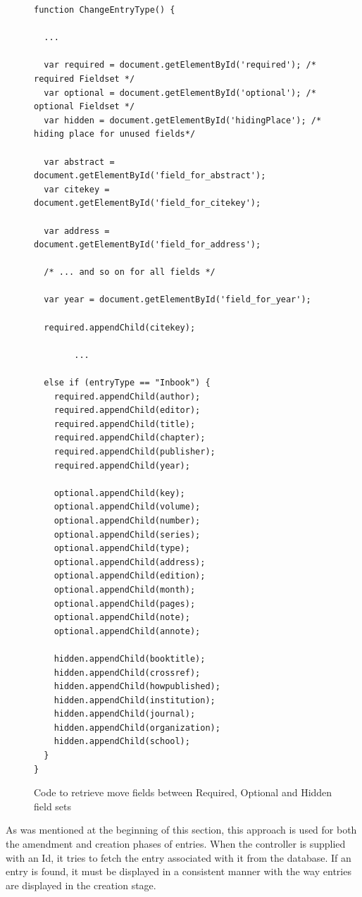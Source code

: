\begin{figure}
	\begin{center}
			\lstset{language=JavaScript} 
			\begin{lstlisting}
function ChangeEntryType() {

  ...

  var required = document.getElementById('required'); /* required Fieldset */
  var optional = document.getElementById('optional'); /* optional Fieldset */
  var hidden = document.getElementById('hidingPlace'); /* hiding place for unused fields*/

  var abstract = document.getElementById('field_for_abstract');
  var citekey = document.getElementById('field_for_citekey');

  var address = document.getElementById('field_for_address');
  
  /* ... and so on for all fields */
  
  var year = document.getElementById('field_for_year');

  required.appendChild(citekey);
		
		...
		
  else if (entryType == "Inbook") {
    required.appendChild(author);
    required.appendChild(editor);
    required.appendChild(title);
    required.appendChild(chapter);
    required.appendChild(publisher);
    required.appendChild(year);

    optional.appendChild(key);
    optional.appendChild(volume);
    optional.appendChild(number);
    optional.appendChild(series);
    optional.appendChild(type);
    optional.appendChild(address);
    optional.appendChild(edition);
    optional.appendChild(month);
    optional.appendChild(pages);
    optional.appendChild(note);
    optional.appendChild(annote);

    hidden.appendChild(booktitle);
    hidden.appendChild(crossref);
    hidden.appendChild(howpublished);
    hidden.appendChild(institution);
    hidden.appendChild(journal);
    hidden.appendChild(organization);
    hidden.appendChild(school);
  }
}
			\end{lstlisting}
		\caption{Code to retrieve move fields between Required, Optional and Hidden field sets}
		\label{fig:SwitchOutFields}
	\end{center}
\end{figure}

As was mentioned at the beginning of this section, this approach is used for both the amendment and creation phases of entries.  When the controller is supplied with an Id, it tries to fetch the entry associated with it from the database.  If an entry is found, it must be displayed in a consistent manner with the way entries are displayed in the creation stage.

